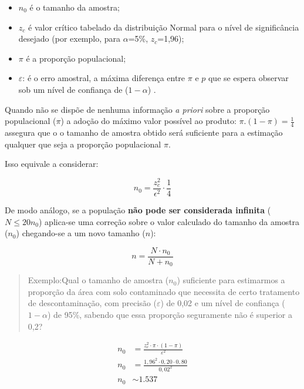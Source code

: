 \documentclass[
]{book}
\providecommand{\tightlist}{%
  \setlength{\itemsep}{0pt}\setlength{\parskip}{0pt}}
\begin{document}
\begin{itemize}
\tightlist
\item
  \(n_{0}\) é o tamanho da amostra;\\
\item
  \(z_{c}\) é valor crítico tabelado da distribuição Normal para o nível de significância desejado (por exemplo, para \(\alpha\)=5\%, \(z_{c}\)=1,96);\\
\item
  \(\pi\) é a proporção populacional;\\
\item
  \(\varepsilon\): é o erro amostral, a máxima diferença entre \(\pi\) e \(p\) que se espera observar sob um nível de confiança de (\(1-\alpha\)) .
\end{itemize}

\hfill\break

Quando não se dispõe de nenhuma informação \emph{a priori} sobre a proporção populacional (\(\pi\)) a adoção do máximo valor possível ao produto: \(\pi . (1- \pi )=\frac{1}{4}\) assegura que o o tamanho de amostra obtido será suficiente para a estimação qualquer que seja a proporção populacional \(\pi\).

\hfill\break

Isso equivale a considerar:

\hfill\break

\[
n_{0} = \frac{z_{c}^{2}}{\epsilon^{2}} \cdot \frac{1}{4}
\]

\hfill\break

De modo análogo, se a população \textbf{não pode ser considerada infinita} (\(N \le 20n_{0}\)) aplica-se uma correção sobre o valor calculado do tamanho da amostra (\(n_{0}\)) chegando-se a um novo tamanho (\(n\)):

\hfill\break

\[
n=\frac{N \cdot n_{0}}{N + n_{0}}
\]

\hfill\break

\begin{quote}
Exemplo:Qual o tamanho de amostra (\(n_{0}\)) suficiente para estimarmos a proporção da área com solo contaminado que necessita de certo tratamento de descontaminação, com precisão (\(\varepsilon\)) de 0,02 e um nível de confiança (\(1-\alpha\)) de 95\%, sabendo que essa proporção seguramente não é superior a 0,2?
\end{quote}

\hfill\break

\begin{align*}
n_{0} & = \frac{z_{c}^{2} \cdot \pi \cdot (1-\pi) }{\varepsilon^{2}} \\
n_{0} & = \frac{1,96^{2} \cdot 0,20 \cdot 0,80 }{0,02^{2}}\\ 
n_{0} & \sim 1.537
\end{align*}
\end{document}
